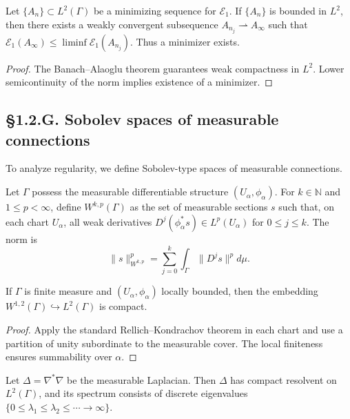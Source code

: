 \begin{theorem}\label{thm:1.2.min}
Let $\{A_n\}\subset L^2(\Gamma)$ be a minimizing sequence for $\mathcal E_1$. 
If $\{A_n\}$ is bounded in $L^2$, then there exists a weakly convergent subsequence $A_{n_j}\rightharpoonup A_\infty$ such that $\mathcal E_1(A_\infty)\le\liminf \mathcal E_1(A_{n_j})$.  
Thus a minimizer exists.
\end{theorem}

\begin{proof}
The Banach–Alaoglu theorem guarantees weak compactness in $L^2$. Lower semicontinuity of the norm implies existence of a minimizer.
\end{proof}

\subsection*{§1.2.G. Sobolev spaces of measurable connections}

To analyze regularity, we define Sobolev-type spaces of measurable connections.

\begin{definition}
Let $\Gamma$ possess the measurable differentiable structure $(U_\alpha,\phi_\alpha)$.
For $k\in\mathbb N$ and $1\le p<\infty$, define $W^{k,p}(\Gamma)$ as the set of measurable sections $s$ such that, on each chart $U_\alpha$, all weak derivatives $D^j(\phi_\alpha^\ast s)\in L^p(U_\alpha)$ for $0\le j\le k$. 
The norm is
\[
\|s\|_{W^{k,p}}^p = \sum_{j=0}^k \int_\Gamma \|D^j s\|^p d\mu.
\]
\end{definition}

\begin{lemma}\label{lem:1.2.rellich}
If $\Gamma$ is finite measure and $(U_\alpha,\phi_\alpha)$ locally bounded, then the embedding $W^{1,2}(\Gamma)\hookrightarrow L^2(\Gamma)$ is compact.
\end{lemma}

\begin{proof}
Apply the standard Rellich–Kondrachov theorem in each chart and use a partition of unity subordinate to the measurable cover. The local finiteness ensures summability over $\alpha$.
\end{proof}

\begin{corollary}
Let $\Delta=\nabla^\ast\nabla$ be the measurable Laplacian. Then $\Delta$ has compact resolvent on $L^2(\Gamma)$, and its spectrum consists of discrete eigenvalues $\{0\le\lambda_1\le\lambda_2\le\cdots\to\infty\}$.
\end{corollary}

